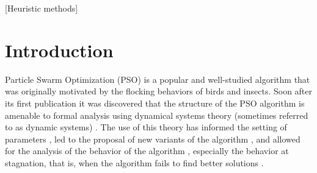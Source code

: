 \documentclass{sig-alternate}
\begin{document}
[Heuristic methods]

\section{Introduction}
\label{sec:intro}
Particle Swarm Optimization (PSO) is a popular and well-studied algorithm that was originally motivated by the flocking behaviors of birds and insects.
Soon after its first publication it was discovered that the structure of the PSO algorithm is amenable to formal analysis using dynamical systems theory (sometimes referred to as dynamic systems) \cite{985692}.
The use of this theory has informed the setting of parameters \cite{Trelea2003317,Jiang20078}, led to the proposal of new variants of the algorithm \cite{985692}, and allowed for the analysis of the behavior of the algorithm \cite{Schmitt:2013:PSO:2463372.2463563}, especially the behavior at stagnation, that is, when the algorithm fails to find better solutions \cite{985692}.
\end{document}
